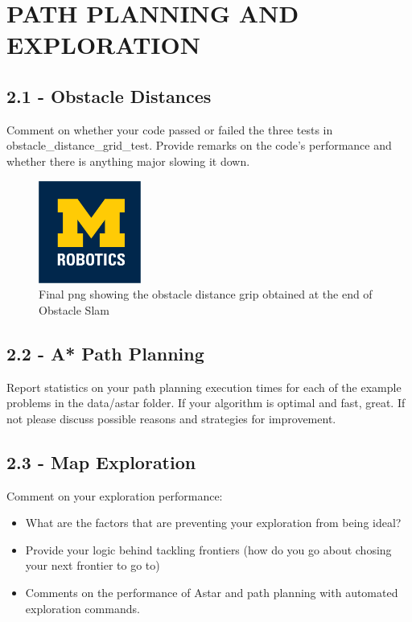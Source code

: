 \documentclass[journal,onecolumn]{IEEEtran}
\begin{document}
\section{PATH PLANNING AND EXPLORATION}

\subsection*{2.1 - Obstacle Distances} 

Comment on whether your code passed or failed the three tests in obstacle\_distance\_grid\_test. Provide remarks on the code’s performance and whether there is anything major slowing it down.

\begin{figure}[H]
\centering
\includegraphics[width=0.3\textwidth]{Media/template-robotics.jpg}
\caption{Final png showing the obstacle distance grip obtained at the end of Obstacle Slam}
\end{figure}


\subsection*{2.2 - A* Path Planning} 

Report statistics on your path planning execution times for each of the example problems in the data/astar folder. If your algorithm is optimal and fast, great. If not please discuss possible reasons and strategies for improvement.

\subsection*{2.3 - Map Exploration} 

Comment on your exploration performance:
 \begin{itemize}
    \item What are the factors that are preventing your exploration from being ideal?
    \item Provide your logic behind tackling frontiers (how do you go about chosing your next frontier to go to)
    \item Comments on the performance of Astar and path planning with automated exploration commands.
\end{itemize}

\ifCLASSOPTIONcaptionsoff
  \newpage
\fi

\nocite{*}


\end{document}
